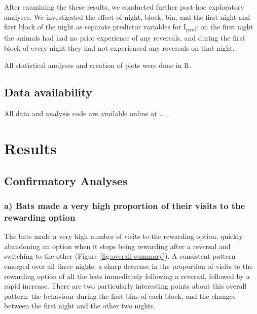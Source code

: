 \documentclass[
]{article}
\begin{document}
After examining the these results, we conducted further post-hoc exploratory analyses. We investigated the effect of night, block, bin, and the first night and first block of the night as separate predictor variables for I\textsubscript{pref}: on the first night the animals had had no prior experience of any reversals, and during the first block of every night they had not experienced any reversals on that night.

All statistical analyses and creation of plots were done in R.

\hypertarget{data-availability}{%
\subsection{Data availability}\label{data-availability}}

All data and analysis code are available online at \ldots..

\hypertarget{results}{%
\section{Results}\label{results}}

\hypertarget{confirmatory-analyses}{%
\subsection{Confirmatory Analyses}\label{confirmatory-analyses}}

\hypertarget{a-bats-made-a-very-high-proportion-of-their-visits-to-the-rewarding-option}{%
\subsubsection{a) Bats made a very high proportion of their visits to the rewarding option}\label{a-bats-made-a-very-high-proportion-of-their-visits-to-the-rewarding-option}}

The bats made a very high number of visits to the rewarding option, quickly abandoning an option when it stops being rewarding after a reversal and switching to the other (Figure \ref{fig:overall-summary}). A consistent pattern emerged over all three nights: a sharp decrease in the proportion of visits to the rewarding option of all the bats immediately following a reversal, followed by a rapid increase. There are two particularly interesting points about this overall pattern: the behaviour during the first bins of each block, and the changes between the first night and the other two nights.
\end{document}
